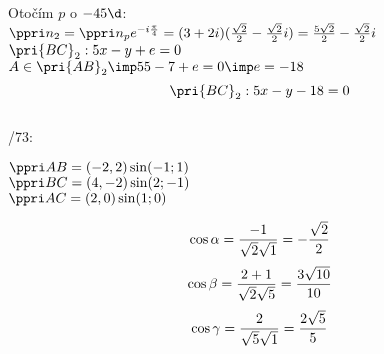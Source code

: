 Otočím $p$ o $-45\d$:\\
$\ve{n_2} = \ve{n_p}\*e^{-i \f\pi4} = (3+2i)(\f{\sqrt 2}2-\frac{\sqrt 2}2i) = \f{5\sqrt 2}2-\f{\sqrt 2}2i$\\
$\pri{BC}_2:  5x - y + e = 0$\\
$A\in\pri{AB}_2 \imp  5\*5 - 7 + e = 0 \imp e=-18$\\
$$\pri{BC}_2:  5x - y -18 = 0$$\\



/73:

$\ve{AB} = (-2,2) \sin (-1;1)$\\
$\ve{BC} = (4,-2) \sin (2;-1)$\\
$\ve{AC} = (2,0) \sin (1;0)$

$$
\cos \alpha = \f{-1}{\sqrt 2 \* \sqrt 1} = -\f{\sqrt 2}2
$$
$$
\cos \beta = \f{2+1}{\sqrt 2 \* \sqrt 5} = \f{3\sqrt {10}}{10}
$$
$$
\cos \gamma = \f{2}{\sqrt 5 \* \sqrt 1} = \f{2\sqrt 5}5
$$




\EndDoc

